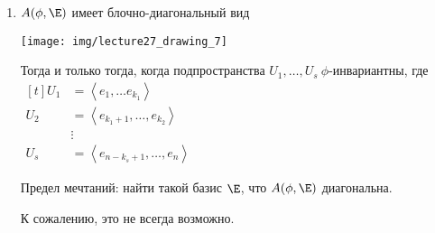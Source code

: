 \begin{enumerate}
    \item
        $A(\phi, \E)$ имеет блочно-диагональный вид
        \begin{center}
            \texttt{[image: img/lecture27\_drawing\_7]}
        \end{center}

        Тогда и только тогда, когда подпространства $U_1, \dots, U_s \ \phi$-инвариантны, где 
        \begin{math}
            \begin{aligned}[t]
                U_1 &= \left<e_1, \dots e_{k_1}\right> \\
                U_2 &= \left< e_{k_1 + 1}, \dots, e_{k_2} \right> \\
                    &\vdots \\
                U_s &= \left< e_{n - k_s + 1}, \dots, e_n \right>
            \end{aligned}
        \end{math}

        Предел мечтаний: найти такой базис $\E$, что $A(\phi, \E)$ диагональна.

        К сожалению, это не всегда возможно.
        \hspace{0.3cm}
\end{enumerate}
